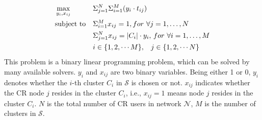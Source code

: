 \documentclass[times]{ettauth}
\newcommand{\ie}{i.e., }
\theoremstyle{mytheoremstyle}
\theoremstyle{mytheoremstyle}
\theoremstyle{mytheoremstyle}
\newcommand{\bigO}{\ensuremath{\mathcal{O}}}%
\begin{document}




\begin{equation}
\begin{aligned}
     &\max\limits_{y_i, x_{ij}} && \Sigma_{j=1}^N\Sigma_{i=1}^M (y_i\cdot t_{ij}) \\
     &\text{subject to}   && \Sigma_{i=1}^M x_{ij} = 1, for\,\,\forall j=1, \ldots, N \\
   &&& \Sigma_{j=1}^N x_{ij} = |C_i|\cdot y_i,\, for\,\,\forall i=1, \ldots, M \\
   &&& i\in \{1,2, \cdots M\}, \hspace{0.3cm} j\in \{1,2,\cdots N\}
\end{aligned}
\label{centralized_opt}
\end{equation}
This problem is a binary linear programming problem, which can be solved by many available solvers.
$y_i$ and $x_{ij}$ are two binary variables.
Being either 1 or 0, $y_i$ denotes whether the $i$-th cluster $C_i$ in $\mathcal{S}$ is chosen or not.
$x_{ij}$ indicates whether the CR node $j$ resides in the cluster $C_i$, \ie $x_{ij}=1$ means node $j$ resides in the cluster $C_i$. 
$N$ is the total number of CR users in network $\mathcal{N}$, $M$ is the number of clusters in $\mathcal{S}$.
\end{document}
